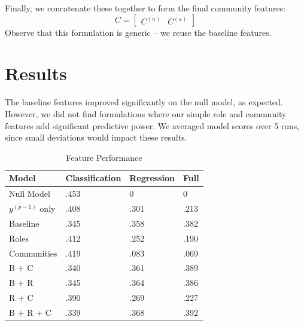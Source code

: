 \documentclass[letterpaper, 12pt, conference]{ieeeconf}
\begin{document}
Finally, we concatenate these together to form the final community features:
\begin{equation}
    C = \begin{bmatrix}
        C^{(u)} & C^{(a)}
    \end{bmatrix}
\end{equation}
Observe that this formulation is generic -- we reuse the baseline features.

\section{Results}

The baseline features improved significantly on the null model, as expected. However, we did not find formulations where our simple role and community features add significant predictive power. We averaged model scores over 5 runs, since small deviations would impact these results.

\begin{table}[ht]
    \caption{Feature Performance}
    \label{tab:logloss}
    \centering
    \begin{tabular}{l|l|l|l}
        \toprule
         Model & Classification & Regression & Full \\
         \midrule
         Null Model & .453 & 0 & 0 \\
         $y^{(p-1)}$ only & .408 & .301 & .213 \\
         Baseline & .345 & .358 & .382 \\
         Roles & .412 & .252 & .190 \\
         Communities & .419 & .083 & .069 \\
         B + C & .340 & .361 & .389 \\
         B + R & .345 & .364 & .386 \\
         R + C & .390 & .269 & .227 \\
         B + R + C & .339 & .368 & .392 \\
         \bottomrule
    \end{tabular}
\end{table}
\end{document}
